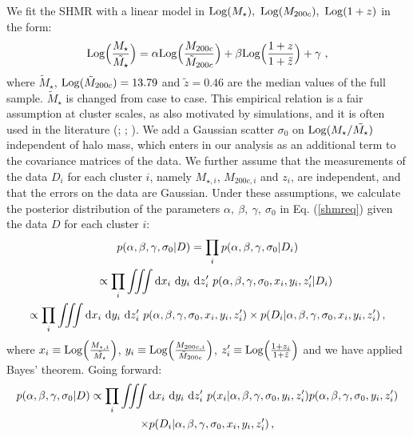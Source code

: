 {We fit the SHMR with a linear model in ${\rm Log}(M_\star),~{\rm Log}(M_{200c}),~{\rm Log}(1+z)$ in the form:
\begin{equation}
{\rm Log}\Big(\frac{M_\star}{\tilde{M_\star}}\Big)=\alpha{\rm Log}\Big(\frac{M_{200c}}{\tilde{M}_{200c}}\Big)+\beta{\rm Log }\Big(\frac{1+z}{1+\tilde{z}}\Big)+\gamma~,\label{shmreq}
\end{equation}
where $\tilde{M}_\star$, ${\rm Log}(\tilde{M}_{200c})=13.79$ and $\tilde{z}=0.46$ are the median values of the full sample. $\tilde{M}_\star$ is changed from case to case. This empirical relation is a fair assumption at cluster scales, as also motivated by simulations, and it is often used in the literature (\citealt{brough}; \citealt{moster10}; \citealt{illustris}). We add a Gaussian scatter $\sigma_0$ on ${\rm Log}(M_\star/\tilde{M_\star})$ independent of halo mass, which enters in our analysis as an additional term to the covariance matrices of the data. We further assume that the measurements of the data $D_i$ for each cluster $i$, namely $M_{\star,i}$, $M_{200c,i}$ and $z_i$, are independent, and that the errors on the data are Gaussian. Under these assumptions, we calculate the posterior distribution of the parameters $\alpha,~\beta,~\gamma,~\sigma_0$ in Eq. (\ref{shmreq}) given the data $D$ for each cluster $i$:
\begin{multline}
p(\alpha,\beta,\gamma,\sigma_0|D)  = \prod_i p(\alpha,\beta,\gamma,\sigma_0|D_i)\\
\hspace{15pt}\propto  \prod_i \iiint  {\rm d} x_i ~{\rm d} y_i ~{\rm d} z'_i ~p(\alpha,\beta,\gamma,\sigma_0, x_i, y_i, z'_i|D_i)\\
\propto \prod_i\iiint {\rm d} x_i ~{\rm d} y_i ~{\rm d} z'_i ~ p(\alpha,\beta,\gamma,\sigma_0, x_i, y_i, z'_i) \times p(D_i | \alpha,\beta,\gamma,\sigma_0, x_i, y_i, z'_i)\,,
\end{multline}
where $x_i \equiv {\rm Log}\Big(\frac{M_{\star,i}}{\tilde{M_\star}}\Big)$, $y_i \equiv {\rm Log}\Big(\frac{M_{200c,i}}{\tilde{M}_{200c}}\Big)$, $z'_i \equiv {\rm Log }\Big(\frac{1+z_i}{1+\tilde{z}}\Big)$ and we have applied Bayes' theorem. Going forward: 
\begin{multline}
p(\alpha,\beta,\gamma,\sigma_0|D)  \propto \prod_i \iiint {\rm d} x_i ~{\rm d} y_i ~{\rm d} z'_i ~ p(x_i |\alpha,\beta,\gamma,\sigma_0, y_i, z'_i) p(\alpha,\beta,\gamma,\sigma_0, y_i, z'_i) \\
\times p(D_i | \alpha,\beta,\gamma,\sigma_0, x_i, y_i, z'_i)\,,
\end{multline}
}
